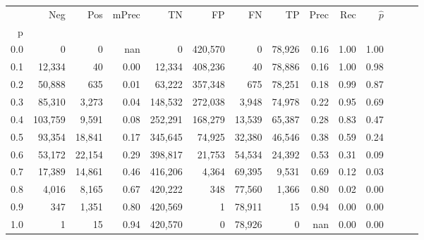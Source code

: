 \begin{tabular}{rrrrrrrrrrrrrr}
\toprule
{} &      Neg &     Pos & mPrec &       TN &       FP &      FN &      TP &  Prec &   Rec & $\hat{p}$ \\
p   &          &         &       &          &          &         &         &       &       &           \\
\midrule
0.0 &        0 &       0 &   nan &        0 &  420,570 &       0 &  78,926 &  0.16 &  1.00 &      1.00 \\
0.1 &   12,334 &      40 &  0.00 &   12,334 &  408,236 &      40 &  78,886 &  0.16 &  1.00 &      0.98 \\
0.2 &   50,888 &     635 &  0.01 &   63,222 &  357,348 &     675 &  78,251 &  0.18 &  0.99 &      0.87 \\
0.3 &   85,310 &   3,273 &  0.04 &  148,532 &  272,038 &   3,948 &  74,978 &  0.22 &  0.95 &      0.69 \\
0.4 &  103,759 &   9,591 &  0.08 &  252,291 &  168,279 &  13,539 &  65,387 &  0.28 &  0.83 &      0.47 \\
0.5 &   93,354 &  18,841 &  0.17 &  345,645 &   74,925 &  32,380 &  46,546 &  0.38 &  0.59 &      0.24 \\
0.6 &   53,172 &  22,154 &  0.29 &  398,817 &   21,753 &  54,534 &  24,392 &  0.53 &  0.31 &      0.09 \\
0.7 &   17,389 &  14,861 &  0.46 &  416,206 &    4,364 &  69,395 &   9,531 &  0.69 &  0.12 &      0.03 \\
0.8 &    4,016 &   8,165 &  0.67 &  420,222 &      348 &  77,560 &   1,366 &  0.80 &  0.02 &      0.00 \\
0.9 &      347 &   1,351 &  0.80 &  420,569 &        1 &  78,911 &      15 &  0.94 &  0.00 &      0.00 \\
1.0 &        1 &      15 &  0.94 &  420,570 &        0 &  78,926 &       0 &   nan &  0.00 &      0.00 \\
\bottomrule
\end{tabular}
